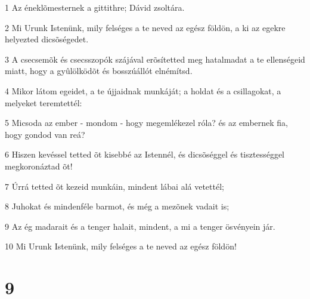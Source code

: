 \par 1 Az éneklõmesternek a gittithre; Dávid zsoltára.
\par 2 Mi Urunk Istenünk, mily felséges a te neved az egész földön, a ki az egekre helyezted dicsõségedet.
\par 3 A csecsemõk és csecsszopók szájával erõsítetted meg hatalmadat a te ellenségeid miatt, hogy a gyûlölködõt és bosszúállót elnémítsd.
\par 4 Mikor látom egeidet, a te újjaidnak munkáját; a holdat és a csillagokat, a melyeket teremtettél:
\par 5 Micsoda az ember - mondom - hogy megemlékezel róla? és az embernek fia, hogy gondod van reá?
\par 6 Hiszen kevéssel tetted õt kisebbé az Istennél, és dicsõséggel és tisztességgel megkoronáztad õt!
\par 7 Úrrá tetted õt kezeid munkáin, mindent lábai alá vetettél;
\par 8 Juhokat és mindenféle barmot, és még a mezõnek vadait is;
\par 9 Az ég madarait és a tenger halait, mindent, a mi a tenger ösvényein jár.
\par 10 Mi Urunk Istenünk, mily felséges a te neved az egész földön!

\chapter{9}


